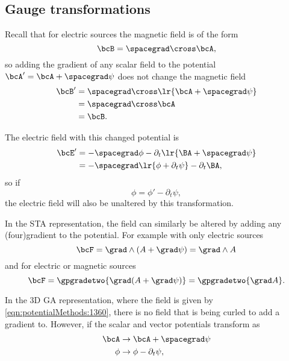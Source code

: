 \subsection{Gauge transformations}
Recall that for electric sources the magnetic field is of the form
\begin{equation}\label{eqn:potentialMethods:1380}
\bcB = \spacegrad \cross \bcA,
\end{equation}
so adding the gradient of any scalar field to the potential \( \bcA' = \bcA + \spacegrad \psi \) does not change the magnetic field
\begin{equation}\label{eqn:potentialMethods:1400}
\begin{aligned}
\bcB'
&= \spacegrad \cross \lr{ \bcA + \spacegrad \psi } \\
&= \spacegrad \cross \bcA \\
&= \bcB.
\end{aligned}
\end{equation}

The electric field with this changed potential is
\begin{equation}\label{eqn:potentialMethods:1420}
\begin{aligned}
\bcE'
&= -\spacegrad \phi - \partial_t \lr{ \BA + \spacegrad \psi} \\
&= -\spacegrad \lr{ \phi + \partial_t \psi } - \partial_t \BA,
\end{aligned}
\end{equation}
so if
\begin{equation}\label{eqn:potentialMethods:1440}
\phi = \phi' - \partial_t \psi,
\end{equation}
the electric field will also be unaltered by this transformation.

In the STA representation, the field can similarly be altered by adding any (four)gradient to the potential.  For example with only electric sources
\begin{equation}\label{eqn:potentialMethods:1460}
\bcF = \grad \wedge (A + \grad \psi) = \grad \wedge A
\end{equation}
and for electric or magnetic sources
\begin{equation}\label{eqn:potentialMethods:1480}
\bcF = \gpgradetwo{ \grad (A + \grad \psi) } = \gpgradetwo{ \grad A }.
\end{equation}

In the 3D GA representation, where the field is given by \cref{eqn:potentialMethods:1360}, there is no field that is being curled to add a gradient to.  However, if the scalar and vector potentials transform as
\begin{equation}\label{eqn:potentialMethods:1500}
\begin{aligned}
\bcA &\rightarrow \bcA + \spacegrad \psi \\
\phi &\rightarrow \phi - \partial_t \psi,
\end{aligned}
\end{equation}

